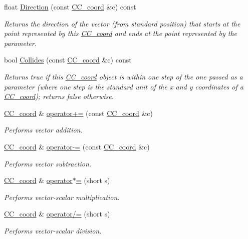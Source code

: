 \begin{DoxyCompactItemize}
float \hyperlink{a00029_add644be1d01386682dd8eb115b4af7b9}{Direction} (const \hyperlink{a00029}{C\-C\-\_\-coord} \&c) const 
\begin{DoxyCompactList}\small\item\em Returns the direction of the vector (from standard position) that starts at the point represented by this \hyperlink{a00029}{C\-C\-\_\-coord} and ends at the point represented by the parameter. \end{DoxyCompactList}\item 
bool \hyperlink{a00029_af4fff5071fce15aa9b316de2d7980f6e}{Collides} (const \hyperlink{a00029}{C\-C\-\_\-coord} \&c) const 
\begin{DoxyCompactList}\small\item\em Returns true if this \hyperlink{a00029}{C\-C\-\_\-coord} object is within one step of the one passed as a parameter (where one step is the standard unit of the x and y coordinates of a \hyperlink{a00029}{C\-C\-\_\-coord}); returns false otherwise. \end{DoxyCompactList}\item 
\hyperlink{a00029}{C\-C\-\_\-coord} \& \hyperlink{a00029_a61000324a3fe34fa9579fa43578b7ca3}{operator+=} (const \hyperlink{a00029}{C\-C\-\_\-coord} \&c)
\begin{DoxyCompactList}\small\item\em Performs vector addition. \end{DoxyCompactList}\item 
\hyperlink{a00029}{C\-C\-\_\-coord} \& \hyperlink{a00029_afa570bee9df745b6639fff9fc39a906f}{operator-\/=} (const \hyperlink{a00029}{C\-C\-\_\-coord} \&c)
\begin{DoxyCompactList}\small\item\em Performs vector subtraction. \end{DoxyCompactList}\item 
\hyperlink{a00029}{C\-C\-\_\-coord} \& \hyperlink{a00029_a7d719b060f44d62e846636f88535f692}{operator$\ast$=} (short s)
\begin{DoxyCompactList}\small\item\em Performs vector-\/scalar multiplication. \end{DoxyCompactList}\item 
\hyperlink{a00029}{C\-C\-\_\-coord} \& \hyperlink{a00029_a4d7b64280048bad9022cafaeecbb94db}{operator/=} (short s)
\begin{DoxyCompactList}\small\item\em Performs vector-\/scalar division. \end{DoxyCompactList}\end{DoxyCompactItemize}

